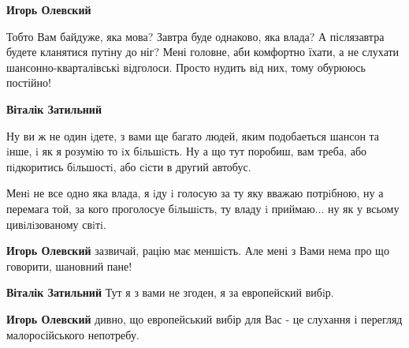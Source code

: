 \begin{itemize}
\begin{itemize}
\begin{itemize}
\textbf{Игорь Олевский} 

Тобто Вам байдуже, яка мова? Завтра буде однаково, яка влада? А післязавтра
будете кланятися путіну до ніг? Мені головне, аби комфортно їхати, а не слухати
шансонно-кварталівські відголоси. Просто нудить від них, тому обурююсь
постійно!

 
\textbf{Віталік Затильний}

Ну ви ж не один iдете, з вами ще багато людей, яким подобаеться шансон та iнше,
i як я розумiю то iх бiльшiсть. Ну а що тут поробиш, вам треба, або пiдкоритись
бiльшостi, або сiсти в другий автобус.

Менi не все одно яка влада, я iду i голосую за ту яку вважаю потрiбною, ну а
перемага той, за кого проголосуе бiльшiсть, ту владу i приймаю... ну як у
всьому цивiлiзованому свiтi.


 
\textbf{Игорь Олевский} зазвичай, рацію має меншість. Але мені з Вами нема про що говорити, шановний пане!

 
\textbf{Віталік Затильний}
Тут я з вами не згоден, я за европейский вибiр.

 
\textbf{Игорь Олевский} дивно, що европейський вибір для Вас - це слухання і перегляд малоросійського непотребу.

 

\end{itemize}
\end{itemize}
\end{itemize}
